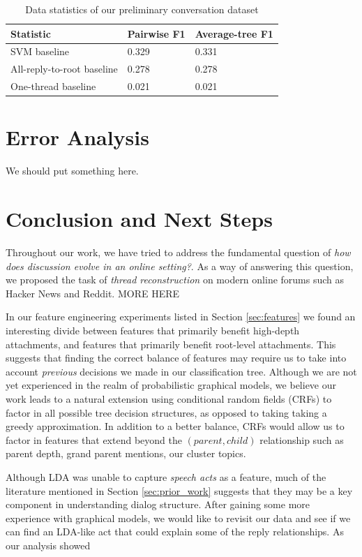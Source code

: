 \documentclass{article}
\begin{document}
\begin{table}[h]\footnotesize
 \begin{tabular}{| l | l | l |} 
   \hline
   \textbf{Statistic} & Pairwise F1 & Average-tree F1 \\
   \hline
    SVM baseline & 0.329 & 0.331 \\
    All-reply-to-root baseline & 0.278 & 0.278 \\
    One-thread baseline & 0.021 & 0.021 \\
   \hline
  \end{tabular}
  \caption{Data statistics of our preliminary conversation dataset}
  \label{table:results}
\end{table}

\section{Error Analysis}
We should put something here.

\section{Conclusion and Next Steps}
Throughout our work, we have tried to address the fundamental question of
\textit{how does discussion evolve in an online setting?}. As a way of answering
this question, we proposed the task of \textit{thread reconstruction} on modern
online forums such as Hacker News and Reddit. MORE HERE

In our feature engineering experiments listed in Section \ref{sec:features} we
found an interesting divide between features that primarily benefit high-depth
attachments, and features that primarily benefit root-level attachments. This
suggests that finding the correct balance of features may require us to take into
account \textit{previous} decisions we made in our classification tree. Although
we are not yet experienced in the realm of probabilistic graphical models, we
believe our work leads to a natural extension using conditional random fields
(CRFs) to factor in all possible tree decision structures, as opposed to taking
taking a greedy approximation. In addition to a better balance, CRFs
would allow us to factor in features that extend beyond the $(parent,child)$
relationship such as parent depth, grand parent mentions, our cluster topics. 

Although LDA was unable to capture \textit{speech acts} as a feature, much of
the literature mentioned in Section \ref{sec:prior_work} suggests that they may
be a key component in understanding dialog structure. After gaining some more
experience with graphical models, we would like to revisit our
data and see if we can find an LDA-like act that could explain some of the reply
relationships. As our analysis showed
\end{document}
